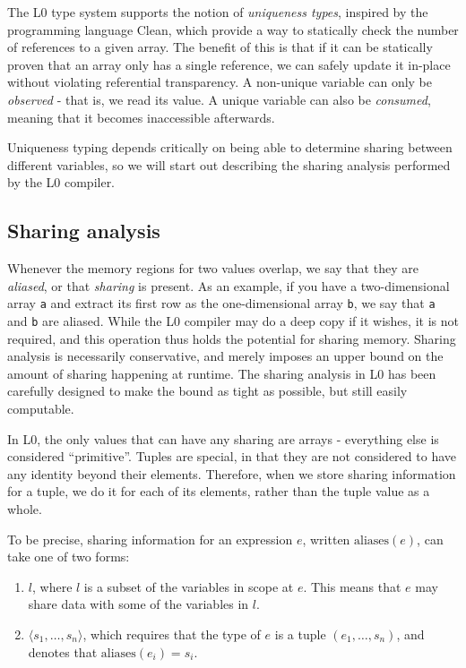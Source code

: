 \documentclass[oneside]{memoir}
\newcommand\aliases[1]{\textrm{aliases}(#1)}
\begin{document}
The L0 type system supports the notion of \emph{uniqueness types},
inspired by the programming language Clean, which provide a way to
statically check the number of references to a given array.  The
benefit of this is that if it can be statically proven that an array
only has a single reference, we can safely update it in-place without
violating referential transparency.  A non-unique variable can only be
\textit{observed} - that is, we read its value.  A unique variable can
also be \textit{consumed}, meaning that it becomes inaccessible
afterwards.

Uniqueness typing depends critically on being able to determine
sharing between different variables, so we will start out describing
the sharing analysis performed by the L0 compiler.

\subsection{Sharing analysis}
\label{subsec:l0-sharing}

Whenever the memory regions for two values overlap, we say that they
are \textit{aliased}, or that \textit{sharing} is present.  As an
example, if you have a two-dimensional array \texttt{a} and extract
its first row as the one-dimensional array \texttt{b}, we say that
\texttt{a} and \texttt{b} are aliased.  While the L0 compiler may do a
deep copy if it wishes, it is not required, and this operation thus
holds the potential for sharing memory.  Sharing analysis is
necessarily conservative, and merely imposes an upper bound on the
amount of sharing happening at runtime.  The sharing analysis in L0
has been carefully designed to make the bound as tight as possible,
but still easily computable.

In L0, the only values that can have any sharing are arrays -
everything else is considered ``primitive''.  Tuples are special, in
that they are not considered to have any identity beyond their
elements.  Therefore, when we store sharing information for a tuple,
we do it for each of its elements, rather than the tuple value as a
whole.

To be precise, sharing information for an expression $e$, written
$\aliases{e}$, can take one of two forms:

\begin{enumerate}
\item $l$, where $l$ is a subset of the variables in scope at $e$.
  This means that $e$ may share data with some of the variables in
  $l$.

\item $\langle s_{1}, \ldots, s_{n} \rangle$, which requires that the
  type of $e$ is a tuple $(e_{1}, \ldots, s_{n})$, and denotes that
  $\aliases{e_{i}} = s_{i}$.
\end{enumerate}
\end{document}
